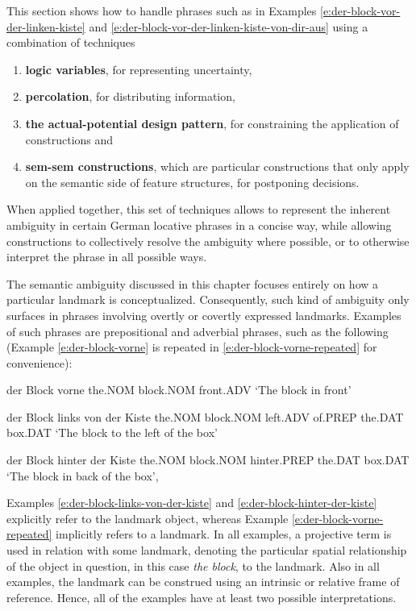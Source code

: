 This section shows how to handle phrases such as in Examples 
\ref{e:der-block-vor-der-linken-kiste} and \ref{e:der-block-vor-der-linken-kiste-von-dir-aus}
using a combination of techniques 
\begin{enumerate}
\item {\bf logic variables}, for representing uncertainty, 
\item {\bf percolation}, for distributing information, 
\item {\bf the actual-potential design pattern}, for constraining the 
application of constructions and 
\item {\bf sem-sem constructions}, which are particular constructions 
that only apply on the semantic side of 
feature structures, for postponing decisions.
\end{enumerate}
When applied together, this set of techniques allows to represent 
the inherent ambiguity in certain German locative phrases in a 
concise way, while allowing constructions to collectively resolve the ambiguity 
where possible, or to otherwise interpret the phrase in all possible ways.

The semantic ambiguity discussed in this chapter 
focuses entirely on how a particular landmark is conceptualized.
Consequently, such kind of ambiguity only surfaces in phrases involving 
overtly or covertly expressed landmarks. Examples
of such phrases are prepositional and adverbial phrases, such as 
the following (Example \ref{e:der-block-vorne} is repeated 
in \ref{e:der-block-vorne-repeated} 
for convenience):
\begin{example}
\label{e:der-block-vorne-repeated}
\gll der Block vorne 
the.NOM block.NOM front.ADV 
\glt `The block in front'
\glend
\item
\label{e:der-block-links-von-der-kiste}
\gll der Block links von der Kiste 
the.NOM block.NOM left.ADV of.PREP the.DAT box.DAT 
\glt `The block to the left of the box'
\glend
\item
\label{e:der-block-hinter-der-kiste}
\gll der Block hinter der Kiste  
the.NOM block.NOM hinter.PREP the.DAT box.DAT 
\glt `The block in back of the box',
\glend
\end{example}
Examples \ref{e:der-block-links-von-der-kiste} and \ref{e:der-block-hinter-der-kiste} 
explicitly refer to the landmark object, whereas 
Example \ref{e:der-block-vorne-repeated} implicitly refers to a landmark. 
In all examples, a projective term is used in relation with some landmark, 
denoting the particular spatial relationship of the object
in question, in this case \emph{the block}, to the landmark. 
Also in all examples, the landmark can be construed using an intrinsic or 
relative frame of reference. Hence, all of the examples have at least two 
possible interpretations.

